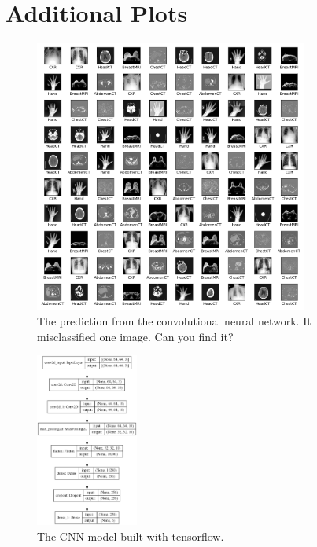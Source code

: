 \documentclass[]{article}
\begin{document}
	\section{Additional Plots}
	\setcounter{figure}{0}    
	\begin{figure}[h]
		\centering
		\includegraphics[width=0.8\textwidth]{images/pred_img_cnn.png}
		\caption{The prediction from the convolutional neural network. It misclassified one image. Can you find it?}
		\label{fig:pred_img}
	\end{figure}
	\begin{figure}[h]
		\centering
		\includegraphics[width=0.3\textwidth]{images/model_cnn.png}
		\caption{The CNN model built with tensorflow.}
		\label{fig:model_cnn}
	\end{figure}
\end{document}
